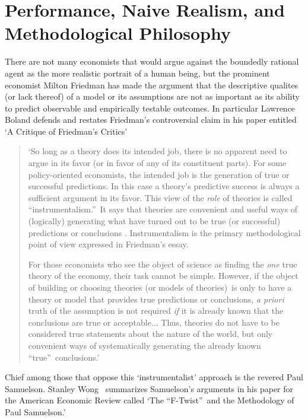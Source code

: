 \documentclass{ucthesis}
\begin{document}
\section{Performance, Naive Realism, and Methodological Philosophy}

There are not many economists that would argue against the boundedly
rational agent as the more realistic portrait of a human being, but the
prominent economist Milton Friedman has made the argument that the
descriptive qualites (or lack thereof) of a model or its assumptions are not
as important as its ability to predict observable and empirically testable
outcomes. In particular Lawrence Boland \cite[1979]{boland 1979} defends and
restates Friedman's controversial claim in his paper entitled `A Critique of
Friedman's Critics'

\begin{quote}
`So long as a theory does its intended job, there is no apparent need to
argue in its favor (or in favor of any of its constituent parts). For some
policy-oriented economists, the intended job is the generation of true or
successful predictions. In this case a theory's predictive success is always
a sufficient argument in its favor. This view of the \textit{role} of
theories is called \textquotedblleft instrumentalism.\textquotedblright\ It
says that theories are convenient and useful ways of (logically) generating
what have turned out to be true (or successful) predictions or conclusions .
Instrumentalism is the primary methodological point of view expressed in
Friedman's essay.

For those economists who see the object of science as finding the \textit{one%
} true theory of the economy, their task cannot be simple. However, if the
object of building or choosing theories (or models of theories)\ is only to
have a theory or model that provides true predictions or conclusions, 
\textit{a priori} truth of the assumption is not required \textit{if} it is
already known that the conclusions are true or acceptable... Thus, theories
do not have to be considered true statements about the nature of the world,
but only convenient ways of systematically generating the already known
\textquotedblleft true\textquotedblright\ conclusions.' \cite[pp. 508-509]%
{boland 1979}
\end{quote}

Chief among those that oppose this `instrumentalist' approach is the revered
Paul Samuelson. Stanley Wong \cite[1973]{wong 1973}\ summarizes Samuelson's
arguments in his paper for the American Economic Review called `The
\textquotedblleft F-Twist\textquotedblright\ and the Methodology of Paul
Samuelson.'
\end{document}
